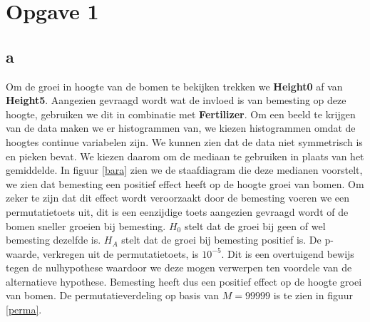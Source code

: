 \documentclass[11pt, a4paper]{article}
\begin{document}
\section*{Opgave 1}
\subsection*{a}
Om de groei in hoogte van de bomen te bekijken trekken we \textbf{Height0} af van \textbf{Height5}. Aangezien gevraagd wordt wat de invloed is van bemesting op deze hoogte, gebruiken we dit in combinatie met \textbf{Fertilizer}. Om een beeld te krijgen van de data maken we er histogrammen van, we kiezen histogrammen omdat de hoogtes continue variabelen zijn. We kunnen zien dat de data niet symmetrisch is en pieken bevat. We kiezen daarom om de mediaan te gebruiken in plaats van het gemiddelde. In figuur \ref{bara} zien we de staafdiagram die deze medianen voorstelt, we zien dat bemesting een positief effect heeft op de hoogte groei van bomen. Om zeker te zijn dat dit effect wordt veroorzaakt door de bemesting voeren we een permutatietoets uit, dit is een eenzijdige toets aangezien gevraagd wordt of de bomen sneller groeien bij bemesting. $H_0$ stelt dat de groei bij geen of wel bemesting dezelfde is. $H_A$ stelt dat de groei bij bemesting positief is. De p-waarde, verkregen uit de permutatietoets, is $10^{-5}$. Dit is een overtuigend bewijs tegen de nulhypothese waardoor we deze mogen verwerpen ten voordele van de alternatieve hypothese. Bemesting heeft dus een positief effect op de hoogte groei van bomen. De permutatieverdeling op basis van $M = 99999$ is te zien in figuur \ref{perma}. %
\end{document}
